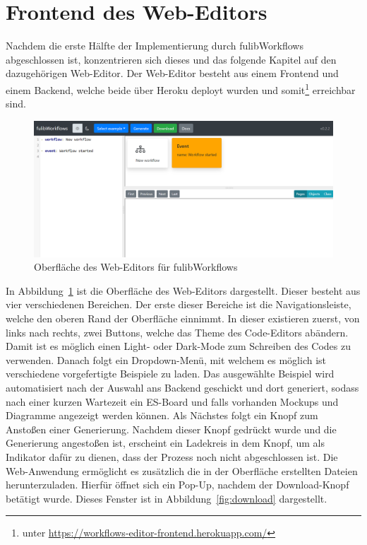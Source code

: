 \section{Frontend des Web-Editors}\label{sec:editor-frontend}
Nachdem die erste Hälfte der Implementierung durch fulibWorkflows abgeschlossen ist, konzentrieren sich dieses und das folgende Kapitel auf den dazugehörigen Web-Editor.
Der Web-Editor besteht aus einem Frontend und einem Backend, welche beide über Heroku deployt wurden und somit\footnote{unter \url{https://workflows-editor-frontend.herokuapp.com/}}
erreichbar sind.

\begin{figure}[h]
    \centering
    \includegraphics[width=1.0\textwidth]{images/3.2/workflows-complete}
    \caption{Oberfläche des Web-Editors für fulibWorkflows}
    \label{fig:frontend}
\end{figure}

In Abbildung~\ref{fig:frontend} ist die Oberfläche des Web-Editors dargestellt.
Dieser besteht aus vier verschiedenen Bereichen.
Der erste dieser Bereiche ist die Navigationsleiste, welche den oberen Rand der Oberfläche einnimmt.
In dieser existieren zuerst, von links nach rechts, zwei Buttons, welche das Theme des Code-Editors abändern.
Damit ist es möglich einen Light- oder Dark-Mode zum Schreiben des Codes zu verwenden.
Danach folgt ein Dropdown-Menü, mit welchem es möglich ist verschiedene vorgefertigte Beispiele zu laden.
Das ausgewählte Beispiel wird automatisiert nach der Auswahl ans Backend geschickt und dort generiert, sodass nach einer kurzen Wartezeit ein \ac{ES}-Board und falls
vorhanden Mockups und Diagramme angezeigt werden können.
Als Nächstes folgt ein Knopf zum Anstoßen einer Generierung.
Nachdem dieser Knopf gedrückt wurde und die Generierung angestoßen ist, erscheint ein Ladekreis in dem Knopf,
um als Indikator dafür zu dienen, dass der Prozess noch nicht abgeschlossen ist.
Die Web-Anwendung ermöglicht es zusätzlich die in der Oberfläche erstellten Dateien herunterzuladen.
Hierfür öffnet sich ein Pop-Up, nachdem der Download-Knopf betätigt wurde.
Dieses Fenster ist in Abbildung~\ref{fig:download} dargestellt.

